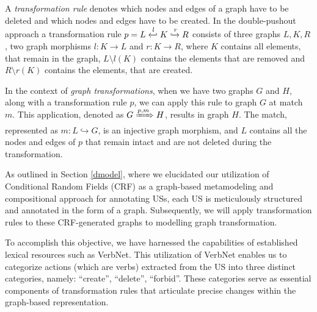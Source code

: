 \begin{definition}
A \emph{transformation rule} denotes which nodes and edges of a graph have to be deleted and which nodes and edges have to be created.
In the double-pushout approach a transformation rule $p = L \xhookleftarrow{l} K \xhookrightarrow{r} R$ consists of three graphs $L,K,R$, two graph morphisms $l: K \to L$ and $r: K \to R$, where $K$ contains all elements, that remain in the graph, $L \setminus l(K)$ contains the elements that are removed and $R \setminus r(K)$ contains the elements, that are created.
\end{definition}
\begin{definition}
In the context of \emph{graph transformations}, when we have two graphs $G$ and $H$, along with a transformation rule $p$, we can apply this rule to graph $G$ at match $m$. This application, denoted as $G \xRightarrow{p,m} H$, results in graph $H$. The match, represented as $m : L \hookrightarrow G$, is an injective graph morphism, and $L$ contains all the nodes and edges of $p$ that remain intact and are not deleted during the transformation.
\end{definition}
As outlined in Section \ref{dmodel}, where we elucidated our utilization of Conditional Random Fields (CRF) as a graph-based metamodeling and compositional approach for annotating USs, each US is meticulously structured and annotated in the form of a graph. Subsequently, we will apply transformation rules to these CRF-generated graphs to modelling graph transformation.

To accomplish this objective, we have harnessed the capabilities of established lexical resources such as VerbNet. This utilization of VerbNet enables us to categorize actions (which are verbs) extracted from the US into three distinct categories, namely: \enquote{create}, \enquote{delete}, \enquote{forbid}. These categories serve as essential components of transformation rules that articulate precise changes within the graph-based representation. 

